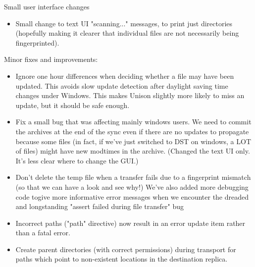 \begin{changesfromversion}{2.31}
\item Small user interface changes
\begin{itemize}
\item Small change to text UI "scanning..." messages, to print just
  directories (hopefully making it clearer that individual files are
  not necessarily being fingerprinted).
\end{itemize}
\item Minor fixes and improvements:
\begin{itemize}
\item Ignore one hour differences when deciding whether a file may have
  been updated.  This avoids slow update detection after daylight
  saving time changes under Windows.  This makes Unison slightly more
  likely to miss an update, but it should be safe enough.
\item Fix a small bug that was affecting mainly windows users.  We need to
  commit the archives at the end of the sync even if there are no
  updates to propagate because some files (in fact, if we've just
  switched to DST on windows, a LOT of files) might have new modtimes
  in the archive.  (Changed the text UI only.  It's less clear where
  to change the GUI.)
\item Don't delete the temp file when a transfer fails due to a
  fingerprint mismatch (so that we can have a look and see why!)  We've also
  added more debugging code togive more informative error messages when we
  encounter the dreaded and longstanding "assert failed during file
  transfer" bug
\item Incorrect paths ("path" directive) now result in an error update
  item rather than a fatal error.
\item Create parent directories (with correct permissions) during
  transport for paths which point to non-existent locations in the
  destination replica.
\end{itemize}
\end{changesfromversion}

